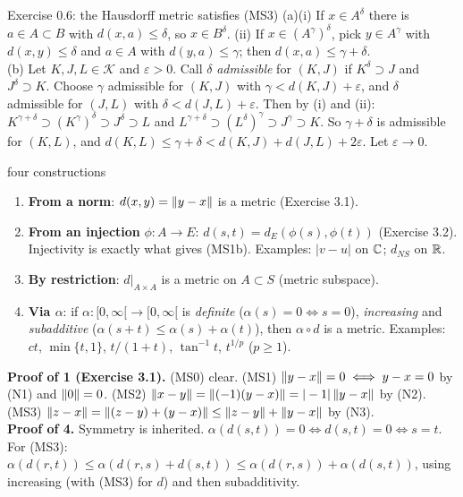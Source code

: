 \begin{example}{Exercise 0.6: the Hausdorff metric satisfies (MS3)}
(a)(i) If $x\in A^\delta$ there is $a\in A\subset B$ with $d(x,a)\le\delta$, so $x\in B^\delta$.
(ii) If $x\in(A^\gamma)^\delta$, pick $y\in A^\gamma$ with $d(x,y)\le\delta$ and $a\in A$ with
$d(y,a)\le\gamma$; then $d(x,a)\le\gamma+\delta$.\\
(b) Let $K,J,L\in\mathcal K$ and $\varepsilon>0$. Call $\delta$ \emph{admissible} for $(K,J)$
if $K^\delta\supset J$ and $J^\delta\supset K$. Choose $\gamma$ admissible for $(K,J)$ with
$\gamma<d(K,J)+\varepsilon$, and $\delta$ admissible for $(J,L)$ with $\delta<d(J,L)+\varepsilon$.
Then by (i) and (ii):
$K^{\gamma+\delta}\supset(K^\gamma)^\delta\supset J^\delta\supset L$ and
$L^{\gamma+\delta}\supset(L^\delta)^\gamma\supset J^\gamma\supset K$.
So $\gamma+\delta$ is admissible for $(K,L)$, and
$d(K,L)\le\gamma+\delta<d(K,J)+d(J,L)+2\varepsilon$. Let $\varepsilon\to0$.
\end{example}

\begin{thm}{four constructions}
\begin{enumerate}
\item \textbf{From a norm}: $d(x,y)=\left\lVert y-x\right\rVert$ is a metric (Exercise 3.1).
\item \textbf{From an injection} $\phi:A\to E$: $d(s,t)=d_E(\phi(s),\phi(t))$ (Exercise 3.2).
  Injectivity is exactly what gives (MS1b). Examples: $|v-u|$ on $\mathbb C$; $d_{NS}$ on $\mathbb R$.
\item \textbf{By restriction}: $d|_{A\times A}$ is a metric on $A\subset S$ (metric subspace).
\item \textbf{Via $\alpha$}: if $\alpha:[0,\infty[\to[0,\infty[$ is \emph{definite}
  ($\alpha(s)=0\iff s=0$), \emph{increasing} and \emph{subadditive}
  ($\alpha(s+t)\le\alpha(s)+\alpha(t)$), then $\alpha\circ d$ is a metric.
  Examples: $ct$, $\min\{t,1\}$, $t/(1+t)$, $\tan^{-1}t$, $t^{1/p}$ ($p\ge1$).
\end{enumerate}
\end{thm}

\begin{answer}
\textbf{Proof of 1 (Exercise 3.1).} (MS0) clear. (MS1) $\left\lVert y-x\right\rVert=0\iff y-x=0$ by (N1) and
$\left\lVert0\right\rVert=0$. (MS2) $\left\lVert x-y\right\rVert=\left\lVert(-1)(y-x)\right\rVert=|-1|\left\lVert y-x\right\rVert$ by (N2).
(MS3) $\left\lVert z-x\right\rVert=\left\lVert(z-y)+(y-x)\right\rVert\le\left\lVert z-y\right\rVert+\left\lVert y-x\right\rVert$ by (N3).\\[2pt]
\textbf{Proof of 4.} Symmetry is inherited. $\alpha(d(s,t))=0\iff d(s,t)=0\iff s=t$. For (MS3):
$\alpha(d(r,t))\le\alpha(d(r,s)+d(s,t))\le\alpha(d(r,s))+\alpha(d(s,t))$, using
increasing (with (MS3) for $d$) and then subadditivity.
\end{answer}


